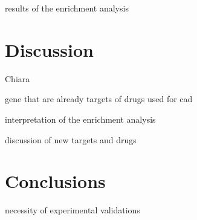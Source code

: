 \documentclass[fleqn,10pt]{SelfArx} %
\begin{document}
results of the enrichment analysis

\section*{Discussion}

Chiara

gene that are already targets of drugs used for cad

interpretation of the enrichment analysis

discussion of new targets and drugs

\section*{Conclusions}

necessity of experimental validations




\end{document}
